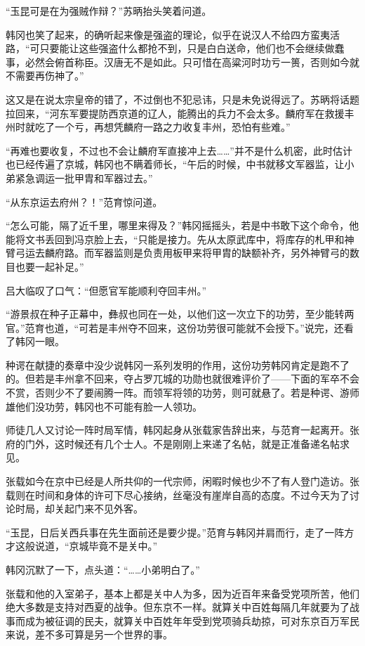 “玉昆可是在为强贼作辩？”苏昞抬头笑着问道。

韩冈也笑了起来，的确听起来像是强盗的理论，似乎在说汉人不给四方蛮夷活路，“可只要能让这些强盗什么都抢不到，只是白白送命，他们也不会继续做蠢事，必然会俯首称臣。汉唐无不是如此。只可惜在高粱河时功亏一篑，否则如今就不需要再伤神了。”

这又是在说太宗皇帝的错了，不过倒也不犯忌讳，只是未免说得远了。苏昞将话题拉回来，“河东军要提防西京道的辽人，能腾出的兵力不会太多。麟府军在救援丰州时就吃了一个亏，再想凭麟府一路之力收复丰州，恐怕有些难。”

“再难也要收复，不过也不会让麟府军直接冲上去……”并不是什么机密，此时估计也已经传遍了京城，韩冈也不瞒着师长，“午后的时候，中书就移文军器监，让小弟紧急调运一批甲胄和军器过去。”

“从东京运去府州？！”范育惊问道。

“怎么可能，隔了近千里，哪里来得及？”韩冈摇摇头，若是中书敢下这个命令，他能将文书丢回到冯京脸上去，“只能是接力。先从太原武库中，将库存的札甲和神臂弓运去麟府路。而军器监则是负责用板甲来将甲胄的缺额补齐，另外神臂弓的数目也要一起补足。”

吕大临叹了口气：“但愿官军能顺利夺回丰州。”

“游景叔在种子正幕中，彝叔也同在一处，以他们这一次立下的功劳，至少能转两官。”范育也道，“可若是丰州夺不回来，这份功劳很可能就不会授下。”说完，还看了韩冈一眼。

种谔在献捷的奏章中没少说韩冈一系列发明的作用，这份功劳韩冈肯定是跑不了的。但若是丰州拿不回来，夺占罗兀城的功勋也就很难评价了——下面的军卒不会不赏，否则少不了要闹腾一阵。而领军将领的功劳，则可就悬了。若是种谔、游师雄他们没功劳，韩冈也不可能有脸一人领功。

师徒几人又讨论一阵时局军情，韩冈起身从张载家告辞出来，与范育一起离开。张府的门外，这时候还有几个士人。不是刚刚上来递了名帖，就是正准备递名帖求见。

张载如今在京中已经是人所共仰的一代宗师，闲暇时候也少不了有人登门造访。张载则在时间和身体的许可下尽心接纳，丝毫没有崖岸自高的态度。不过今天为了讨论时局，却关起门来不见外客。

“玉昆，日后关西兵事在先生面前还是要少提。”范育与韩冈并肩而行，走了一阵方才这般说道，“京城毕竟不是关中。”

韩冈沉默了一下，点头道：“……小弟明白了。”

张载和他的入室弟子，基本上都是关中人为多，因为近百年来备受党项所苦，他们绝大多数是支持对西夏的战争。但东京不一样。就算关中百姓每隔几年就要为了战事而成为被征调的民夫，就算关中百姓年年受到党项骑兵劫掠，可对东京百万军民来说，差不多可算是另一个世界的事。

